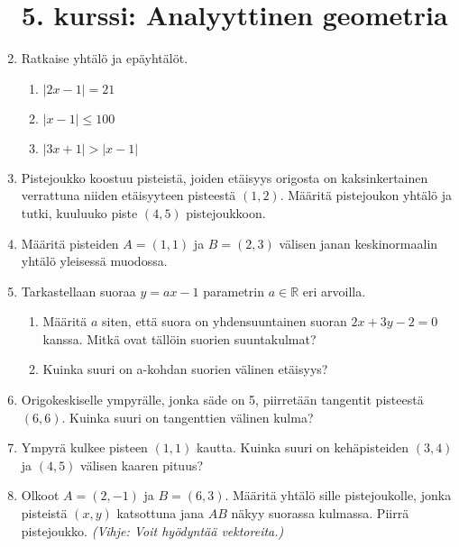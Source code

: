 \documentclass[12pt,fleqn]{article}
\begin{document}
\begin{enumerate}[label=\textbf{\arabic*.}]





\newpage
\section*{5. kurssi: Analyyttinen geometria}

\item Ratkaise yhtälö ja epäyhtälöt.
\begin{enumerate}[label=\textbf{\alph*)}]
\item \(|2x-1|=21\)
\item \(|x-1|\leq 100\)
\item \(|3x+1|>|x-1|\)
\end{enumerate}

\item Pistejoukko koostuu pisteistä, joiden etäisyys origosta on kaksinkertainen verrattuna niiden etäisyyteen pisteestä \((1,2)\). Määritä pistejoukon yhtälö ja tutki, kuuluuko piste \((4,5)\) pistejoukkoon.

\item Määritä pisteiden \(A=(1,1)\) ja \(B=(2,3)\) välisen janan keskinormaalin yhtälö yleisessä muodossa.

\item Tarkastellaan suoraa \(y=ax-1\) parametrin \(a\in \mathbb{R}\) eri arvoilla.
\begin{enumerate}[label=\textbf{\alph*)}]
\item Määritä \(a\) siten, että suora on yhdensuuntainen suoran \(2x+3y-2=0\) kanssa. Mitkä ovat tällöin suorien suuntakulmat?
\item Kuinka suuri on a-kohdan suorien välinen etäisyys?
\end{enumerate}

\item Origokeskiselle ympyrälle, jonka säde on 5, piirretään tangentit pisteestä \((6,6)\). Kuinka suuri on tangenttien välinen kulma?

\item Ympyrä kulkee pisteen \((1,1)\) kautta. Kuinka suuri on kehäpisteiden \((3,4)\) ja \((4,5)\) välisen kaaren pituus?

\item Olkoot \(A=(2,-1)\) ja \(B=(6,3)\). Määritä yhtälö sille pistejoukolle, jonka pisteistä \((x,y)\) katsottuna jana \(AB\) näkyy suorassa kulmassa. Piirrä pistejoukko. \emph{(Vihje: Voit hyödyntää vektoreita.)}


\end{enumerate}
\end{document}
